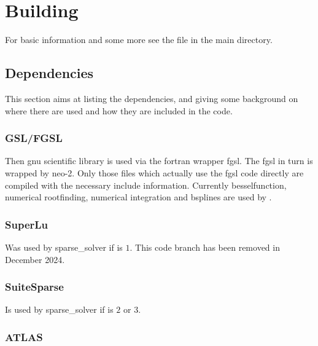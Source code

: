 \chapter{Building}
For basic information and some more see the file  in the
\neotwo main directory.

\section{Dependencies}
This section aims at listing the dependencies, and giving some
background on where there are used and how they are included in the
code.

\subsection{GSL/FGSL}
Then gnu scientific library is used via the fortran wrapper fgsl. The
fgsl in turn is wrapped by neo-2. Only those files which actually use
the fgsl code directly are compiled with the necessary include
information.
Currently besselfunction, numerical rootfinding, numerical integration
and bsplines are used by \neotwo.

\subsection{SuperLu}
Was used by sparse\_solver if  is $1$.
This code branch has been removed in December 2024.

\subsection{SuiteSparse}
Is used by sparse\_solver if  is
$2$ or $3$.

\subsection{ATLAS}


